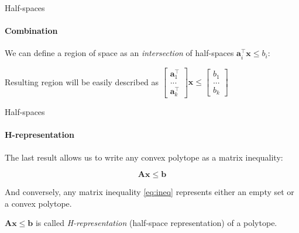\documentclass{beamer}
\begin{document}
\begin{frame}{Half-spaces}
\framesubtitle{Combination}
\begin{flushleft}

We can define a region of space as an \emph{intersection} of half-spaces $\mathbf{a}_i^\top \mathbf{x} \leq b_i$:



Resulting region will be easily described as $\begin{bmatrix} \mathbf{a}_1^\top \\ ... \\ \mathbf{a}_k^\top \end{bmatrix} \mathbf{x} \leq \begin{bmatrix} b_1 \\ ... \\ b_k \end{bmatrix}$

 
\end{flushleft}
\end{frame}


\begin{frame}{Half-spaces}
\framesubtitle{H-representation}
\begin{flushleft}

The last result allows us to write any convex polytope as a matrix inequality:

\begin{equation}
\label{eq:ineq} 
    \mathbf{A} \mathbf{x} \leq  \mathbf{b} 
\end{equation}

And conversely, any matrix inequality \eqref{eq:ineq} represents either an empty set or a convex polytope.

\bigskip

\begin{definition}
 $\mathbf{A} \mathbf{x} \leq  \mathbf{b}$ is called \emph{H-representation} (half-space representation) of a polytope.
\end{definition}
 
\end{flushleft}
\end{frame}
\end{document}
